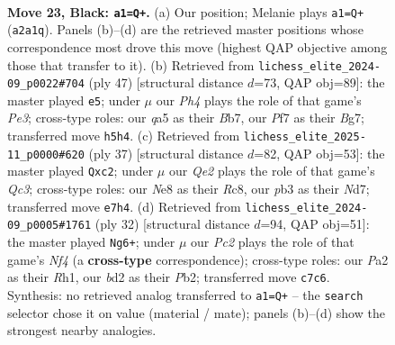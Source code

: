 \documentclass[11pt]{article}
\begin{document}
\clearpage

\begin{figure}[p]\centering
\begin{subfigure}{0.46\textwidth}\centering
\resizebox{\linewidth}{!}{%
\newchessgame
\chessboard[
  setfen={r2rn1k1/p1p1qp2/6p1/Q1PpPb1p/3N4/1P2P1P1/p2BRP1P/3K1BR1 b - - 4 23},
  showmover=false,
  pgfstyle=straightmove, color=movearrow, markmove={a2-a1}
]}
\caption{}
\end{subfigure}\hfill
\begin{subfigure}{0.46\textwidth}\centering
\resizebox{\linewidth}{!}{%
\newchessgame
\chessboard[
  setfen={1r2r3/1b1q1pbk/1p1pp1pn/7p/2PpP3/P2P2PP/1QN2PB1/1RB2RK1 b - - 9 24},
  showmover=false,
  pgfstyle=straightmove, color=movearrow, markmove={e6-e5}
]}
\caption{}
\end{subfigure}
\\[4pt]
\begin{subfigure}{0.46\textwidth}\centering
\resizebox{\linewidth}{!}{%
\newchessgame
\chessboard[
  setfen={r1r3k1/3npp1p/p1qp2p1/8/1p2PN2/bP2BP2/P1PQ2PP/1R3RK1 b - - 4 19},
  showmover=false,
  pgfstyle=straightmove, color=movearrow, markmove={c6-c2}
]}
\caption{}
\end{subfigure}\hfill
\begin{subfigure}{0.46\textwidth}\centering
\resizebox{\linewidth}{!}{%
\newchessgame
\chessboard[
  setfen={r1b4k/pp4pp/1npq1r2/5p1P/3PpN2/P3P3/BP3PP1/R2QK2R w KQ - 1 17},
  showmover=false,
  pgfstyle=straightmove, color=movearrow, markmove={f4-g6}
]}
\caption{}
\end{subfigure}
\caption{\textbf{Move 23, Black: \texttt{a1=Q+}.} (a) Our position; Melanie plays \texttt{a1=Q+} (\texttt{a2a1q}). Panels (b)--(d) are the retrieved master positions whose correspondence most drove this move (highest QAP objective among those that transfer to it). (b) Retrieved from \texttt{lichess\_elite\_2024-09\_p0022\#704} (ply 47) [structural distance $d$=73, QAP obj=89]: the master played \texttt{e5}; under $\mu$ our \emph{Ph4} plays the role of that game's \emph{Pe3}; cross-type roles: our \emph{q}a5 as their \emph{B}b7, our \emph{P}f7 as their \emph{B}g7; transferred move \texttt{h5h4}. (c) Retrieved from \texttt{lichess\_elite\_2025-11\_p0000\#620} (ply 37) [structural distance $d$=82, QAP obj=53]: the master played \texttt{Qxc2}; under $\mu$ our \emph{Qe2} plays the role of that game's \emph{Qc3}; cross-type roles: our \emph{N}e8 as their \emph{R}c8, our \emph{p}b3 as their \emph{N}d7; transferred move \texttt{e7h4}. (d) Retrieved from \texttt{lichess\_elite\_2024-09\_p0005\#1761} (ply 32) [structural distance $d$=94, QAP obj=51]: the master played \texttt{Ng6+}; under $\mu$ our \emph{Pc2} plays the role of that game's \emph{Nf4} (a \textbf{cross-type} correspondence); cross-type roles: our \emph{P}a2 as their \emph{R}h1, our \emph{b}d2 as their \emph{P}b2; transferred move \texttt{c7c6}. Synthesis: no retrieved analog transferred to \texttt{a1=Q+} -- the \texttt{search} selector chose it on value (material / mate); panels (b)--(d) show the strongest nearby analogies.}
\label{fig:thought-m45}
\end{figure}
\end{document}
